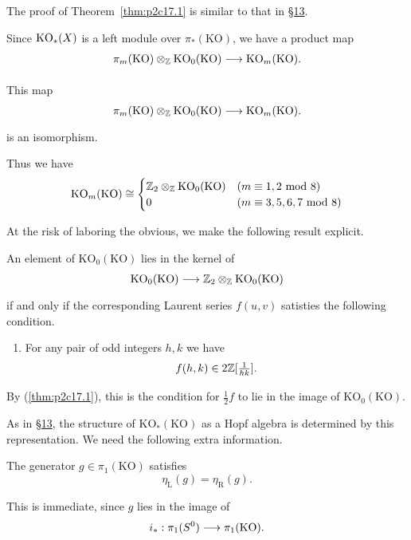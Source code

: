 \documentclass[../main]{subfiles}
\begin{document}
The proof of Theorem~\ref{thm:p2c17.1} is similar to that in \hyperref[sec:p2c13]{\S 13}.

Since $\mathrm{KO}_\ast(X)$ is a left module over $\pi_\ast(\mathrm{KO})$, we have a product map
\[
\pi_m(\mathrm{KO}) \otimes_\bbZ \mathrm{KO}_0(\mathrm{KO})
\lar{}
\mathrm{KO}_m(\mathrm{KO}).
\]

\setcounter{theorem}{6} %
\begin{theorem}
\label{thm:p2c17.7}
This map 
\[
\pi_m(\mathrm{KO}) \otimes_\bbZ \mathrm{KO}_0(\mathrm{KO})
\lar{}
\mathrm{KO}_m(\mathrm{KO}).
\]
is an isomorphism.
\end{theorem}

Thus we have
\[
\mathrm{KO}_m(\mathrm{KO})
\cong
\begin{cases}
\bbZ_2 \otimes_\bbZ \mathrm{KO}_0(\mathrm{KO}) &(m\equiv 1,2 \ \text{mod 8})     \\
0                                              &(m\equiv 3,5,6,7 \ \text{mod 8})
\end{cases}
\]

At the risk of laboring the obvious, we make the following result explicit.
\begin{proposition}
\label{prop:p2c17.8}
An element of $\mathrm{KO}_0(\mathrm{KO})$ lies in the kernel of
\[
\mathrm{KO}_0(\mathrm{KO})
\lar{}
\bbZ_2 \otimes_\bbZ \mathrm{KO}_0(\mathrm{KO})
\]
if and only if the corresponding Laurent series $f(u,v)$ satisties the following condition.
    \begin{enumerate}[label=(\thechapter.\arabic*), start=9]
        \item \label{part 2 condition 17.9}
        For any pair of odd integers $h,k$ we have
        \[
        f(h,k) \in 2\mathbb{Z}[\tfrac{1}{hk}].
        \]
    \end{enumerate}
\end{proposition}

By (\ref{thm:p2c17.1}), this is the condition for $\frac 12 f$ to lie in the image of $\mathrm{KO}_0(\mathrm{KO})$.

As in \hyperref[sec:p2c13]{\S13}, the structure of $\mathrm{KO}_\ast(\mathrm{KO})$ as a Hopf algebra is determined by this representation. We need the following extra information.


\setcounter{theorem}{9} %
\begin{proposition}
\label{prop:p2ch17.10}
The generator $g\in \pi_1(\mathrm{KO})$ satisfies
\[
\eta_{\mathrm L}(g) = \eta_{\mathrm R}(g).
\]
\end{proposition}

This is immediate, since $g$ lies in the image of
\[
i_\ast: \pi_1(S^0) \lar{} \pi_1(\mathrm{KO}).
\]
\end{document}
